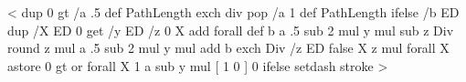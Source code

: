 %
\def\psls@dashed{%
  \ifpsdashadjust
    [ \psk@dash ] \pst@linetype\space \tx@DashLine
  \else
    [ \psk@dash ] 0 setdash stroke
  \fi}
<
    dup 0 gt
    { /a .5 def PathLength exch div }
    { pop /a 1 def PathLength } ifelse
    /b ED %
    dup /X ED %
    0 get /y ED %
    /z 0 X {add} forall def %
    b a .5 sub 2 mul y mul sub z Div round
    z mul a .5 sub 2 mul y mul add b exch Div
    /z ED %
    false %
    X { z mul } forall X astore %
    {0 gt or} forall
    { X 1 a sub y mul }
    { [ 1 0 ] 0 }
    ifelse
    setdash stroke >
%
%
%
\def\psFormatInt{\def\pst@par{}\pst@object{psFormatInt}}
\def\psFormatInt@i#1{{%
  \pst@killglue
  \use@par
  \count1=#1\count2=\count1
  \ifnum\count1=0 0\else
    \ifnum\count1>999999
    \count3=\count1
    \divide\count3 by 1000000
    \the\count3\psk@intSeparator\relax
    \multiply\count3 by 1000000
    \advance\count1 by -\count3 %
  \fi%
  \ifnum\count2>999
    \count3=\count1
    \divide\count3 by 1000
    \ifnum\count2>99999
	\ifnum\count3<100 0\fi
	\ifnum\count3<10 0\fi
    \fi%
    \the\count3\psk@intSeparator\relax
    \multiply\count3 by 1000
    \advance\count1 by -\count3 %
  \fi%
  \ifnum\count2>999
    \ifnum\count1<100 0\fi
    \ifnum\count1<10 0\fi
  \fi%
  \the\count1
  \fi%
}\ignorespaces}
%
\newdimen\pst@braceWidth
{}
%
\def\@@rput@iv(#1){\pst@killglue\pst@makebox{\@@rput@v{#1}}}
